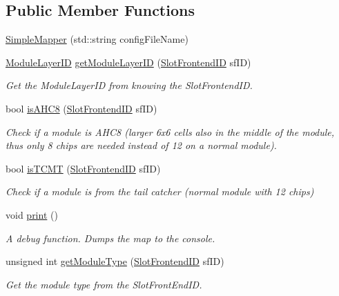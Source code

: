 \subsection*{Public Member Functions}
\begin{DoxyCompactItemize}
\item 
\hyperlink{class_simple_mapper_aac9a4d9921f0f079f2f0a4778a83c27d}{Simple\-Mapper} (std\-::string config\-File\-Name)
\item 
\hyperlink{class_simple_mapper_a6fbef133414fb482f870ab56e7237682}{Module\-Layer\-I\-D} \hyperlink{class_simple_mapper_a33ffad5d6bdccd5347630b65764e4b99}{get\-Module\-Layer\-I\-D} (\hyperlink{class_simple_mapper_a2b973730223591df7c876a6dfbb922a0}{Slot\-Frontend\-I\-D} sf\-I\-D)
\begin{DoxyCompactList}\small\item\em Get the Module\-Layer\-I\-D from knowing the Slot\-Frontend\-I\-D. \end{DoxyCompactList}\item 
bool \hyperlink{class_simple_mapper_a02936c8c25f05737945901618a777515}{is\-A\-H\-C8} (\hyperlink{class_simple_mapper_a2b973730223591df7c876a6dfbb922a0}{Slot\-Frontend\-I\-D} sf\-I\-D)
\begin{DoxyCompactList}\small\item\em Check if a module is A\-H\-C8 (larger 6x6 cells also in the middle of the module, thus only 8 chips are needed instead of 12 on a normal module). \end{DoxyCompactList}\item 
bool \hyperlink{class_simple_mapper_a09cf4f914abaad39fc4cc039f4e41ea2}{is\-T\-C\-M\-T} (\hyperlink{class_simple_mapper_a2b973730223591df7c876a6dfbb922a0}{Slot\-Frontend\-I\-D} sf\-I\-D)
\begin{DoxyCompactList}\small\item\em Check if a module is from the tail catcher (normal module with 12 chips) \end{DoxyCompactList}\item 
void \hyperlink{class_simple_mapper_a0cfad0a5093ba57a9540b99f850cd474}{print} ()
\begin{DoxyCompactList}\small\item\em A debug function. Dumps the map to the console. \end{DoxyCompactList}\item 
unsigned int \hyperlink{class_simple_mapper_a857de2500f82b01e1a6f116df8aed8a6}{get\-Module\-Type} (\hyperlink{class_simple_mapper_a2b973730223591df7c876a6dfbb922a0}{Slot\-Frontend\-I\-D} sf\-I\-D)
\begin{DoxyCompactList}\small\item\em Get the module type from the Slot\-Front\-End\-I\-D. \end{DoxyCompactList}\end{DoxyCompactItemize}
